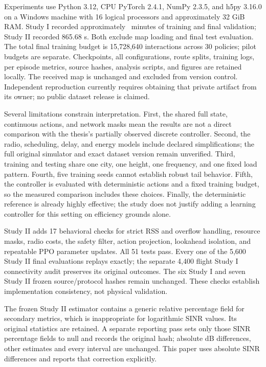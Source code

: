 \documentclass[conference]{IEEEtran}
\begin{document}
Experiments use Python 3.12, CPU PyTorch 2.4.1, NumPy 2.3.5, and h5py 3.16.0
on a Windows machine with 16 logical processors and approximately 32 GiB RAM.
Study I recorded approximately \TrainingMinutes\ minutes of training and final
validation; Study II recorded 865.68 s. Both exclude map loading and final test
evaluation. The total final training budget is 15,728,640 interactions across
30 policies; pilot budgets are separate.
Checkpoints, all configurations, route splits, training logs, per episode
metrics, source hashes, analysis scripts, and figures are retained locally.
The received map is unchanged and excluded from version control. Independent
reproduction currently requires obtaining that private artifact from its owner;
no public dataset release is claimed.

Several limitations constrain interpretation. First, the shared full state,
continuous actions, and network masks mean the results are not a direct
comparison with the thesis's partially observed discrete controller. Second,
the radio, scheduling, delay, and energy models include declared simplifications;
the full original simulator and exact dataset version remain unverified.
Third, training and testing share one city, one height, one frequency, and one
fixed load pattern. Fourth, five training seeds cannot establish robust tail
behavior. Fifth, the controller is evaluated with deterministic actions and a
fixed training budget, so the measured comparison includes these choices.
Finally, the deterministic reference is already highly effective; the study
does not justify adding a learning controller for this setting on efficiency
grounds alone.

Study II adds 17 behavioral checks for strict RSS and overflow handling,
resource masks, radio costs, the safety filter, action projection, lookahead
isolation, and repeatable PPO parameter updates. All 51 tests pass. Every one
of the 5,600 Study II final evaluations replays exactly; the separate 4,400
flight Study I connectivity audit preserves its original outcomes. The six
Study I and seven Study II frozen source/protocol hashes remain unchanged.
These checks establish implementation consistency, not physical validation.

The frozen Study II estimator contains a generic relative percentage field
for secondary metrics, which is inappropriate for logarithmic SINR values.
Its original statistics are retained. A separate reporting pass sets only
those SINR percentage fields to null and records the original hash; absolute
dB differences, other estimates and every interval are unchanged. This paper
uses absolute SINR differences and reports that correction explicitly.
\end{document}

